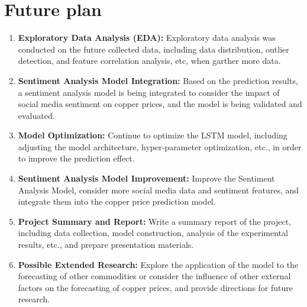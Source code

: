 \documentclass[project-plan]{report-template}
\begin{document}
\section{Future plan}
\begin{enumerate}
    \item \textbf{Exploratory Data Analysis (EDA):} Exploratory data analysis was conducted on the future collected data, including data distribution, outlier detection, and feature correlation analysis, etc, when garther more data.

    \item \textbf{Sentiment Analysis Model Integration:} Based on the prediction results, a sentiment analysis model is being integrated to consider the impact of social media sentiment on copper prices, and the model is being validated and evaluated.

    \item \textbf{Model Optimization:} Continue to optimize the LSTM model, including adjusting the model architecture, hyper-parameter optimization, etc., in order to improve the prediction effect.
    
    \item \textbf{Sentiment Analysis Model Improvement:} Improve the Sentiment Analysis Model, consider more social media data and sentiment features, and integrate them into the copper price prediction model.
            
    \item \textbf{Project Summary and Report:} Write a summary report of the project, including data collection, model construction, analysis of the experimental results, etc., and prepare presentation materials.
    
    \item \textbf{Possible Extended Research:} Explore the application of the model to the forecasting of other commodities or consider the influence of other external factors on the forecasting of copper prices, and provide directions for future research.
\end{enumerate}
\end{document}
